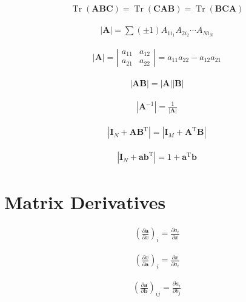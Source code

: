 \documentclass{article}
\begin{document}
\begin{align*}
\operatorname{Tr}(\mathbf{A B C}) = \operatorname{Tr}(\mathbf{C A B}) = \operatorname{Tr}(\mathbf{B C A})
\tag{A.9}
\end{align*}

\begin{align*}
|\mathbf{A}| = \sum( \pm 1) A_{1 i_{1}} A_{2 i_{2}} \cdots A_{N i_{N}}
\tag{A.10}
\end{align*}

\begin{align*}
|\mathbf{A}| = \left|\begin{array}{ll}
a_{11} & a_{12} \\
a_{21} & a_{22}
\end{array}\right| = a_{11} a_{22} - a_{12} a_{21}
\tag{A.11}
\end{align*}

\begin{align*}
|\mathbf{A B}| = |\mathbf{A}| |\mathbf{B}|
\tag{A.12}
\end{align*}

\begin{align*}
\left|\mathbf{A}^{-1}\right| = \frac{1}{|\mathbf{A}|}
\tag{A.13}
\end{align*}

\begin{align*}
\left|\mathbf{I}_{N} + \mathbf{A B}^{\mathrm{T}}\right| = \left|\mathbf{I}_{M} + \mathbf{A}^{\mathrm{T}} \mathbf{B}\right|
\tag{A.14}
\end{align*}

\begin{align*}
\left|\mathbf{I}_{N} + \mathbf{a b}^{\mathrm{T}}\right| = 1 + \mathbf{a}^{\mathrm{T}} \mathbf{b}
\tag{A.15}
\end{align*}

\section{Matrix Derivatives}

\begin{align*}
\left(\frac{\partial \mathbf{a}}{\partial x}\right)_{i} = \frac{\partial a_{i}}{\partial x}
\tag{A.16}
\end{align*}

\begin{align*}
\left(\frac{\partial x}{\partial \mathbf{a}}\right)_{i} = \frac{\partial x}{\partial a_{i}}
\tag{A.17}
\end{align*}

\begin{align*}
\left(\frac{\partial \mathbf{a}}{\partial \mathbf{b}}\right)_{i j} = \frac{\partial a_{i}}{\partial b_{j}}
\tag{A.18}
\end{align*}
\end{document}
